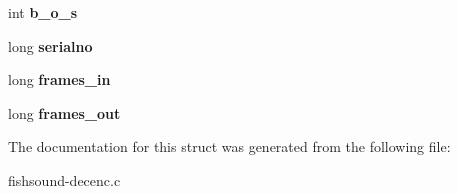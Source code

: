 \begin{DoxyCompactItemize}
\item 
int {\bfseries b\-\_\-o\-\_\-s}\label{structFS__DecEnc_a97e671e05484152af5cb9ef15c12f326}

\item 
long {\bfseries serialno}\label{structFS__DecEnc_a29c30cd0d4f27593f46baa093090c796}

\item 
long {\bfseries frames\-\_\-in}\label{structFS__DecEnc_ac5ae45affea8c8eb37d9cd0bbb1e90c1}

\item 
long {\bfseries frames\-\_\-out}\label{structFS__DecEnc_aa418b3a09dd310193bb7e4d7d4d69445}

\end{DoxyCompactItemize}


The documentation for this struct was generated from the following file\-:\begin{DoxyCompactItemize}
\item 
fishsound-\/decenc.\-c\end{DoxyCompactItemize}
